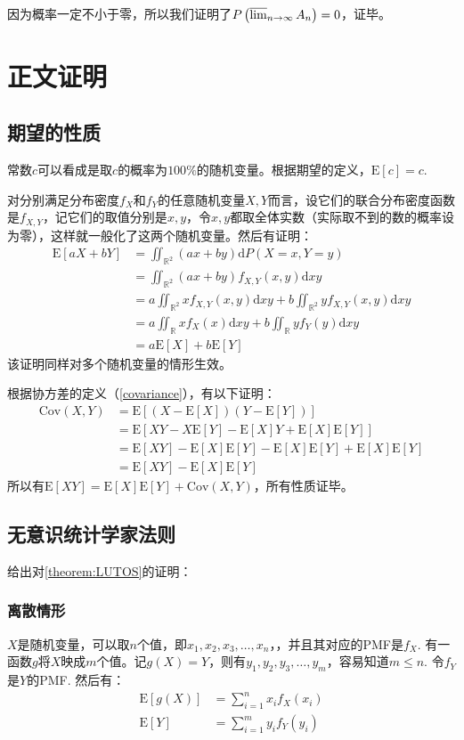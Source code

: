 \documentclass[UTF8]{ctexbook}
\begin{document}
因为概率一定不小于零，所以我们证明了$P\left(\varlimsup_{n\to\infty}A_n\right)=0$，证毕。
\section{正文证明}
\subsection{期望的性质}
\label{mean-proof}
常数$c$可以看成是取$c$的概率为$100\%$的随机变量。根据期望的定义，$\mathrm E[c]=c$.

对分别满足分布密度$f_X$和$f_Y$的任意随机变量$X, Y$而言，设它们的联合分布密度函数是$f_{X,Y}$，记它们的取值分别是$x, y$，令$x, y$都取全体实数（实际取不到的数的概率设为零），这样就一般化了这两个随机变量。然后有证明：
\begin{align*}
	\mathrm E[aX+bY]&=\iint_{\mathbb{R}^2}(ax+by)\mathrm dP(X=x, Y=y) \\
	&=\iint_{\mathbb{R}^2}(ax+by)f_{X,Y}(x,y)\mathrm dxy \\
	&=a\iint_{\mathbb{R}^2}xf_{X,Y}(x,y)\mathrm dxy+b\iint_{\mathbb{R}^2}yf_{X,Y}(x,y)\mathrm dxy \\
	&=a\iint_{\mathbb{R}}xf_{X}(x)\mathrm dxy+b\iint_{\mathbb{R}}yf_{Y}(y)\mathrm dxy \\
	&=a\mathrm E[X]+b\mathrm E[Y]
\end{align*}
该证明同样对多个随机变量的情形生效。

根据协方差的定义（\ref{covariance}），有以下证明：
\begin{align*}
	\mathrm{Cov}(X,Y)&=\mathrm E[(X-\mathrm E[X])(Y-\mathrm E[Y])] \\
	&=\mathrm E[XY-X\mathrm E[Y]-\mathrm E[X]Y+\mathrm E[X]\mathrm E[Y]] \\
	&=\mathrm E[XY]-\mathrm E[X]\mathrm E[Y]-\mathrm E[X]\mathrm E[Y]+\mathrm E[X]\mathrm E[Y]\\
	&=\mathrm E[XY]-\mathrm E[X]\mathrm E[Y]
\end{align*}
所以有$\mathrm E[XY]=\mathrm E[X]\mathrm E[Y]+\mathrm{Cov}(X,Y)$，所有性质证毕。
\subsection{无意识统计学家法则}
\label{LUTOS-proof}
给出对\autoref{theorem:LUTOS}的证明：
\subsubsection{离散情形}
$X$是随机变量，可以取$n$个值，即$x_1,x_2,x_3,\dots,x_n$，，并且其对应的PMF是$f_X$. 有一函数$g$将$X$映成$m$个值。记$g(X)=Y$，则有$y_1,y_2,y_3,\dots,y_m$，容易知道$m\leq n$. 令$f_Y$是$Y$的PMF. 然后有：
\begin{align*}
	\mathrm E[g(X)]&=\sum_{i=1}^nx_if_X(x_i) \\
	\mathrm E[Y]&=\sum_{i=1}^my_if_Y(y_i)
\end{align*}
\end{document}
